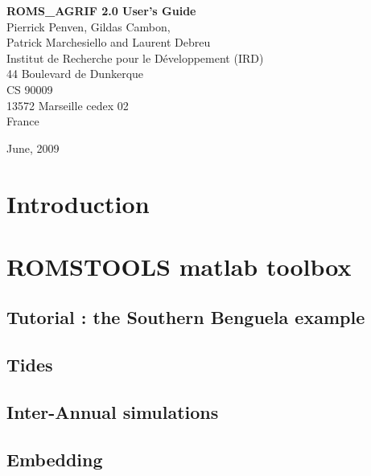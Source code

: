 \documentclass[11pt]{book}
\begin{document}
\pagestyle{empty}
\begin{center}
\vspace{3 cm}
{\huge \bf ROMS\_AGRIF 2.0 User's Guide }\\
\vspace{2 cm}
{\Large Pierrick Penven, Gildas Cambon, \\ 
Patrick Marchesiello and Laurent Debreu}\\ 
\vspace{1 cm}
{\Large Institut de Recherche pour le D\'eveloppement (IRD)}\\
\vspace{0.5 cm}
{\large 44 Boulevard de Dunkerque} \\
{\large CS 90009} \\
{\large 13572 Marseille cedex 02} \\
{\Large France} \\
\vspace{2cm}
\centerline{}
\vspace{1cm}
{June, 2009}
\end{center}

\chapter*{Introduction}

\newpage
\tableofcontents
\newpage
\chapter{ROMSTOOLS matlab toolbox}





\section{Tutorial : the Southern Benguela example}


\section{Tides}


\section{Inter-Annual simulations}


\section{Embedding}

\end{document}
